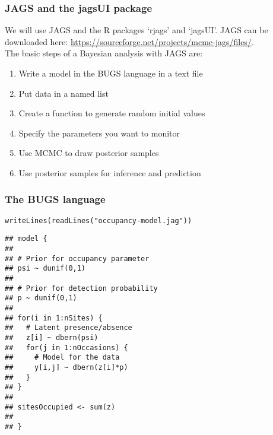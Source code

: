 \documentclass[color=usenames,dvipsnames]{beamer}\usepackage[]{graphicx}\usepackage[]{color}
\makeatletter
\newcommand{\hlstr}[1]{\textcolor[rgb]{0.749,0.012,0.012}{#1}}%
\newcommand{\hlstd}[1]{\textcolor[rgb]{0,0,0}{#1}}%
\newcommand{\hlkwd}[1]{\textcolor[rgb]{0.004,0.004,0.506}{#1}}%
\newenvironment{kframe}{%
 \def\at@end@of@kframe{}%
 \ifinner\ifhmode%
  \def\at@end@of@kframe{\end{minipage}}%
  \begin{minipage}{\columnwidth}%
 \fi\fi%
 \def\FrameCommand##1{\hskip\@totalleftmargin \hskip-\fboxsep
 \colorbox{shadecolor}{##1}\hskip-\fboxsep
     \hskip-\linewidth \hskip-\@totalleftmargin \hskip\columnwidth}%
 \MakeFramed {\advance\hsize-\width
   \@totalleftmargin\z@ \linewidth\hsize
   \@setminipage}}%
 {\par\unskip\endMakeFramed%
 \at@end@of@kframe}
\newenvironment{knitrout}{}{} %
\makeatother
\begin{document}
\begin{frame}
  \frametitle{JAGS and the jagsUI package}
  We will use JAGS and the R packages `rjags' and `jagsUI'. JAGS can
  be downloaded here: \url{https://sourceforge.net/projects/mcmc-jags/files/}. \\
  \pause
  \vfill
  The basic steps of a Bayesian analysis with JAGS are:
  \begin{enumerate}%
    \item Write a model in the BUGS language in a text file
    \item Put data in a named list
    \item Create a function to generate random initial values
    \item Specify the parameters you want to monitor
    \item Use MCMC to draw posterior samples
    \item Use posterior samples for inference and prediction
  \end{enumerate}
\end{frame}



\begin{frame}[fragile]
  \frametitle{The BUGS language}
\begin{knitrout}\scriptsize
{}\color{fgcolor}\begin{kframe}
\begin{alltt}
\hlkwd{writeLines}\hlstd{(}\hlkwd{readLines}\hlstd{(}\hlstr{"occupancy-model.jag"}\hlstd{))}
\end{alltt}
\begin{verbatim}
## model {
## 
## # Prior for occupancy parameter
## psi ~ dunif(0,1)
## 
## # Prior for detection probability
## p ~ dunif(0,1)
## 
## for(i in 1:nSites) {
##   # Latent presence/absence
##   z[i] ~ dbern(psi)   
##   for(j in 1:nOccasions) {
##     # Model for the data
##     y[i,j] ~ dbern(z[i]*p)
##   }
## }
## 
## sitesOccupied <- sum(z)
## 
## }
\end{verbatim}
\end{kframe}
\end{knitrout}
\end{frame}
\end{document}
